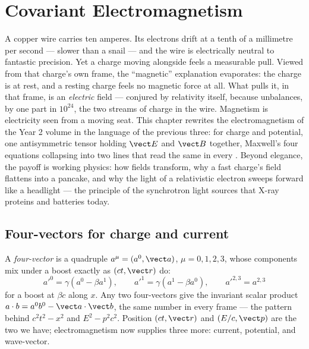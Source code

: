 \chapter{Covariant Electromagnetism}\label{ch:b3:covariant-electromagnetism}

A copper wire carries ten amperes. Its electrons drift at a tenth of
a millimetre per second --- slower than a snail --- and the wire is
electrically neutral to fantastic precision. Yet a charge moving
alongside feels a measurable pull. Viewed from that charge's own
frame, the ``magnetic'' explanation evaporates: the charge is at
rest, and a resting charge feels no magnetic force at all. What pulls
it, in that frame, is an \emph{electric} field --- conjured by
relativity itself, because  unbalances, by one part
in $10^{24}$, the two streams of charge in the wire. Magnetism is
electricity seen from a moving seat. This chapter rewrites the
electromagnetism of the Year 2 volume in the language of the previous
three:  for charge and potential, one antisymmetric
tensor holding $\vect E$ and $\vect B$ together, Maxwell's four
equations collapsing into two lines that read the same in every
. Beyond elegance, the payoff is working physics: how
fields transform, why a fast charge's field flattens into a pancake,
and why the light of a relativistic electron sweeps forward like a
headlight --- the principle of the synchrotron light sources that
X-ray proteins and batteries today.

\section{Four-vectors for charge and current}

\begin{definition}\label{def:b3:covariant-electromagnetism:fourvector}
A \emph{four-vector} is a quadruple $a^\mu = (a^0, \vect a)$, $\mu =
0, 1, 2, 3$, whose components mix under a boost exactly as $(ct,
\vect r)$ do:
\[
a'^0 = \gamma(a^0 - \beta a^1) , \qquad
a'^1 = \gamma(a^1 - \beta a^0) , \qquad
a'^{2,3} = a^{2,3}
\]
for a boost at $\beta c$ along $x$. Any two four-vectors give the
invariant scalar product $a\cdot b = a^0b^0 - \vect a\cdot\vect b$,
the same number in every frame --- the pattern behind $c^2t^2 - x^2$
and $E^2 - p^2c^2$. Position $(ct, \vect r)$ and 
$(E/c, \vect p)$ are the two we have; electromagnetism now supplies
three more: current, potential, and wave-vector.
\end{definition}

